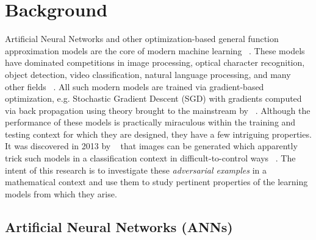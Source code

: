 
\section{Background}

Artificial Neural Networks and other optimization-based general
function approximation models are the core of modern
machine learning ~\citep{prakash2018}. These models have dominated competitions in image processing, optical character recognition, object detection, video classification, natural language processing, and many other fields ~\citep{SCHMIDHUBER201585}. All such modern models are
trained via gradient-based optimization, e.g. Stochastic Gradient Descent (SGD) with
gradients computed via back propagation using theory brought to the
mainstream by ~\citet{goodfellow2013multidigit}. Although the performance of these models is practically
miraculous within the training and testing context for which they are
designed, they have a few intriguing properties. It was discovered in
2013 by ~\citet{szegedy2013} that images can be generated
which apparently trick such models in a classification context in  difficult-to-control ways ~\citep{khoury2018}. The intent of this
research is to investigate these \emph{adversarial examples} in a
mathematical context and use them to study pertinent 
properties of the learning models from which they arise.

\subsection{Artificial Neural Networks (ANNs)}


